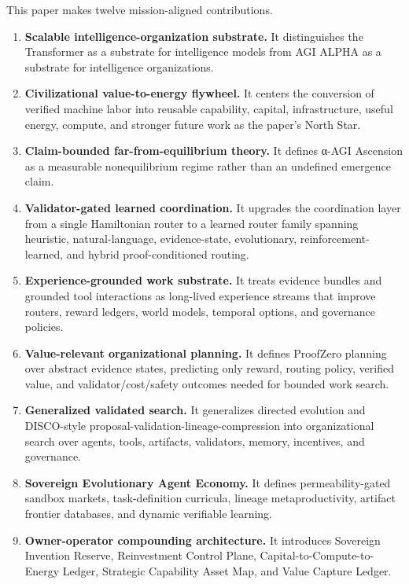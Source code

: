 \documentclass[11pt]{article}
\providecommand{\tightlist}{\setlength{\itemsep}{0pt}\setlength{\parskip}{0pt}}
\begin{document}
This paper makes twelve mission-aligned contributions.

\begin{enumerate}
\def\labelenumi{\arabic{enumi}.}
\tightlist
\item
  \textbf{Scalable intelligence-organization substrate.} It distinguishes the Transformer as a substrate for intelligence models from AGI ALPHA as a substrate for intelligence organizations.
\item
  \textbf{Civilizational value-to-energy flywheel.} It centers the conversion of verified machine labor into reusable capability, capital, infrastructure, useful energy, compute, and stronger future work as the paper's North Star.
\item
  \textbf{Claim-bounded far-from-equilibrium theory.} It defines α-AGI Ascension as a measurable nonequilibrium regime rather than an undefined emergence claim.
\item
  \textbf{Validator-gated learned coordination.} It upgrades the coordination layer from a single Hamiltonian router to a learned router family spanning heuristic, natural-language, evidence-state, evolutionary, reinforcement-learned, and hybrid proof-conditioned routing.
\item
  \textbf{Experience-grounded work substrate.} It treats evidence bundles and grounded tool interactions as long-lived experience streams that improve routers, reward ledgers, world models, temporal options, and governance policies.
\item
  \textbf{Value-relevant organizational planning.} It defines ProofZero planning over abstract evidence states, predicting only reward, routing policy, verified value, and validator/cost/safety outcomes needed for bounded work search.
\item
  \textbf{Generalized validated search.} It generalizes directed evolution and DISCO-style proposal-validation-lineage-compression into organizational search over agents, tools, artifacts, validators, memory, incentives, and governance.
\item
  \textbf{Sovereign Evolutionary Agent Economy.} It defines permeability-gated sandbox markets, task-definition curricula, lineage metaproductivity, artifact frontier databases, and dynamic verifiable learning.
\item
  \textbf{Owner-operator compounding architecture.} It introduces Sovereign Invention Reserve, Reinvestment Control Plane, Capital-to-Compute-to-Energy Ledger, Strategic Capability Asset Map, and Value Capture Ledger.

\end{enumerate}
\end{document}
